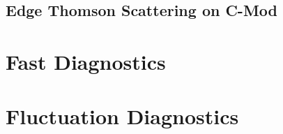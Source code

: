 \subsection{Edge Thomson Scattering on C-Mod}\label{subsec:app_ts_cmod}

\nicesectionending

\section{Fast Diagnostics}\label{sec:app_fast}

\nicesectionending

\section{Fluctuation Diagnostics}\label{sec:app_fluct}

\nicechapterending



